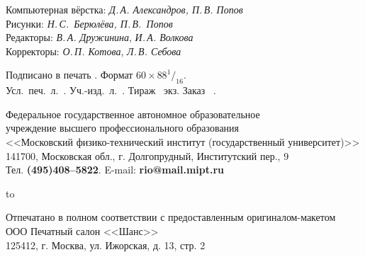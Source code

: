 {\footnotesize\raggedright

Компьютерная вёрстка: {\it Д.\,А. Александров, П.\,В. Попов}\\
Рисунки: {\it Н.\,С.~Берюлёва, П.\,В.~Попов}\\
Редакторы: {\it В.\,А. Дружинина}, {\it И.\,А. Волкова}\\
Корректоры: {\it О.\,П. Котова}, {\it Л.\,В. Себова}

\bigskip

Подписано в печать \ppech. Формат $60\times88^1{/}_{16}$.\\
Усл.~печ.~л.~\upl. Уч.-изд.~л.~\uil. Тираж \tirag~экз. Заказ \No~\zakaz.

\bigskip

Федеральное государственное автономное образовательное\\
учреждение высшего профессионального образования\\
<<Московский физико-технический институт
(государственный университет)>>\\
141700, Московская обл., г. Долгопрудный, Институтский пер., 9\\
Тел. {\bf (495)408--5822}. E-mail: {\bf rio@mail.mipt.ru}

\medskip

\hfil \hbox to \textwidth{\hrulefill}\par

Отпечатано в полном соответствии с предоставленным оригиналом-макетом\\
ООО Печатный салон <<Шанс>>\\
125412, г. Москва, ул. Ижорская, д. 13, стр. 2


}

